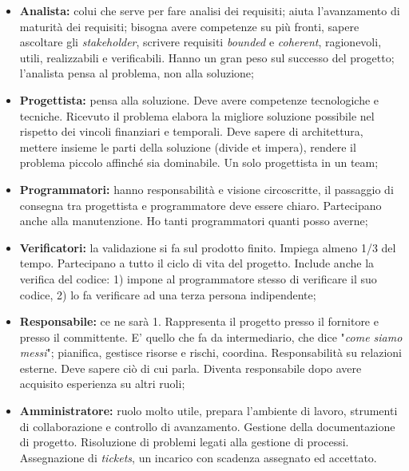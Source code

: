 \begin{itemize}

	\item \textbf{Analista:} colui che serve per fare analisi dei requisiti; aiuta l'avanzamento di maturità dei requisiti; bisogna avere competenze su più fronti, sapere ascoltare gli \textit{stakeholder}, scrivere requisiti \textit{bounded} e \textit{coherent}, ragionevoli, utili, realizzabili e verificabili. Hanno un gran peso sul successo del progetto; l'analista pensa al problema, non alla soluzione;
	
	\item \textbf{Progettista:} pensa alla soluzione. Deve avere competenze tecnologiche e tecniche. Ricevuto il problema elabora la migliore soluzione possibile nel rispetto dei vincoli finanziari e temporali. Deve sapere di architettura, mettere insieme le parti della soluzione (divide et impera), rendere il problema piccolo affinché sia dominabile. Un solo progettista in un team;
	
	\item \textbf{Programmatori:} hanno responsabilità e visione circoscritte, il passaggio di consegna tra progettista e programmatore deve essere chiaro. Partecipano anche alla manutenzione. Ho tanti programmatori quanti posso averne;
	
	\item \textbf{Verificatori:} la validazione si fa sul prodotto finito. Impiega almeno 1/3 del tempo. Partecipano a tutto il ciclo di vita del progetto. Include anche la verifica del codice: 1) impone al programmatore stesso di verificare il suo codice, 2) lo fa verificare ad una terza persona indipendente;
	
	\item \textbf{Responsabile:} ce ne sarà 1. Rappresenta il progetto presso il fornitore e presso il committente. E' quello che fa da intermediario, che dice "\textit{come siamo messi}"; pianifica, gestisce risorse e rischi, coordina. Responsabilità su relazioni esterne. Deve sapere ciò di cui parla. Diventa responsabile dopo avere acquisito esperienza su altri ruoli;
	
	\item \textbf{Amministratore:} ruolo molto utile, prepara l'ambiente di lavoro, strumenti di collaborazione e controllo di avanzamento. Gestione della documentazione di progetto. Risoluzione di problemi legati alla gestione di processi. Assegnazione di \textit{tickets}, un incarico con scadenza assegnato ed accettato.
\end{itemize}

